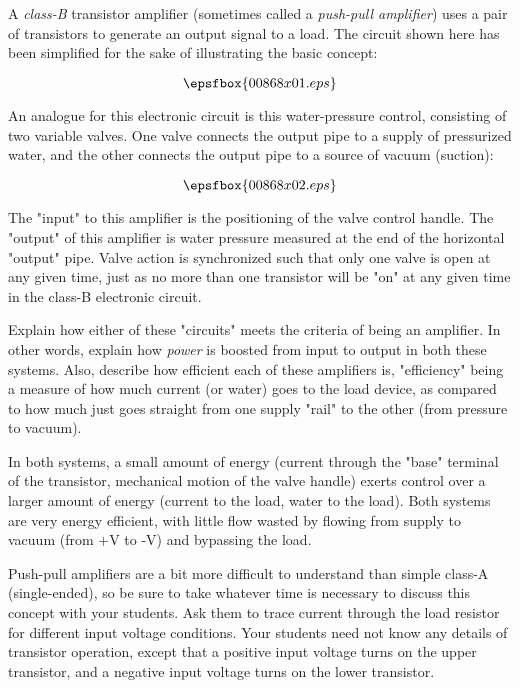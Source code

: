 

A {\it class-B} transistor amplifier (sometimes called a {\it push-pull amplifier}) uses a pair of transistors to generate an output signal to a load.  The circuit shown here has been simplified for the sake of illustrating the basic concept:

$$\epsfbox{00868x01.eps}$$

An analogue for this electronic circuit is this water-pressure control, consisting of two variable valves.  One valve connects the output pipe to a supply of pressurized water, and the other connects the output pipe to a source of vacuum (suction):

$$\epsfbox{00868x02.eps}$$

The "input" to this amplifier is the positioning of the valve control handle.  The "output" of this amplifier is water pressure measured at the end of the horizontal "output" pipe.  Valve action is synchronized such that only one valve is open at any given time, just as no more than one transistor will be "on" at any given time in the class-B electronic circuit.

\vskip 10pt

Explain how either of these "circuits" meets the criteria of being an amplifier.  In other words, explain how {\it power} is boosted from input to output in both these systems.  Also, describe how efficient each of these amplifiers is, "efficiency" being a measure of how much current (or water) goes to the load device, as compared to how much just goes straight from one supply "rail" to the other (from pressure to vacuum).







In both systems, a small amount of energy (current through the "base" terminal of the transistor, mechanical motion of the valve handle) exerts control over a larger amount of energy (current to the load, water to the load).  Both systems are very energy efficient, with little flow wasted by flowing from supply to vacuum (from +V to -V) and bypassing the load.







Push-pull amplifiers are a bit more difficult to understand than simple class-A (single-ended), so be sure to take whatever time is necessary to discuss this concept with your students.  Ask them to trace current through the load resistor for different input voltage conditions.  Your students need not know any details of transistor operation, except that a positive input voltage turns on the upper transistor, and a negative input voltage turns on the lower transistor.




